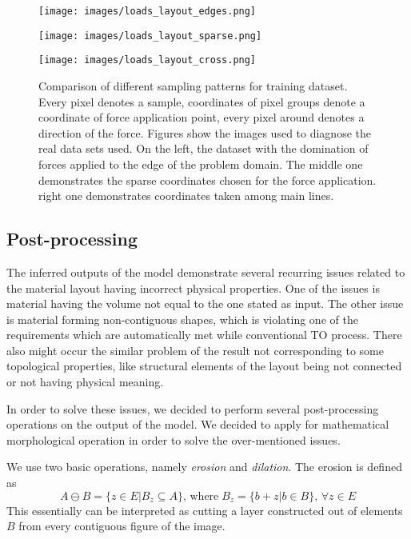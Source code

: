 \begin{figure*}
\begin{multicols}{3}
	\texttt{[image: images/loads\_layout\_edges.png]}\par
	\texttt{[image: images/loads\_layout\_sparse.png]}\par
	\texttt{[image: images/loads\_layout\_cross.png]}\par
\end{multicols}
\label{fig:sampling_layout}
\caption{Comparison of different sampling patterns for training dataset. Every pixel denotes a sample, coordinates of pixel groups denote a coordinate of force application point, every pixel around denotes a direction of the force. Figures show the images used to diagnose the real data sets used. On the left, the dataset with the domination of forces applied to the edge of the problem domain. The middle one demonstrates the sparse coordinates chosen for the force application. right one demonstrates coordinates taken among main lines.   
}
\end{figure*}
\medskip
 
\subsection{Post-processing}

The inferred outputs of the model demonstrate several recurring issues related to the material layout having incorrect physical properties.
One of the issues is material having the volume not equal to the one stated as input.
The other issue is material forming non-contiguous shapes, which is violating one of the requirements which are automatically met while conventional TO process.
There also might occur the similar problem of the result not corresponding to some topological properties, like structural elements of the layout being not connected or not having physical meaning.
\medskip

In order to solve these issues, we decided to perform several post-processing operations on the output of the model.
We decided to apply for mathematical morphological operation in order to solve the over-mentioned issues.
\medskip

We use two basic operations, namely \emph{erosion} and \emph{dilation}\cite{bibl:er-dil}.
The erosion is defined as 
\begin{equation}
A \ominus B = \{z \in E | B_{z} \subseteq A \}, \, \mathrm{where} \; B_{z}=\{ b+z | b \in B \}, \, \forall z \in E 
\end{equation} 
This essentially can be interpreted as cutting a layer constructed out of elements $B$ from every contiguous figure of the image.
\medskip

